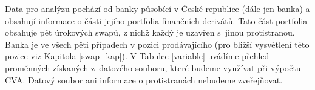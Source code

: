 \documentclass[a4paper,12pt]{report}
\theoremstyle{definition} \newtheorem{definice}[veta]{Definice}
\theoremstyle{remark}
\begin{document}
Data pro analýzu pochází od banky působící v České republice (dále jen banka) a obsahují informace o části jejího portfolia finančních derivátů.
Tato část portfolia obsahuje pět úrokových swapů, z nichž každý je uzavřen s~jinou protistranou.
Banka je ve všech pěti případech v pozici prodávajícího (pro bližší vysvětlení této pozice viz Kapitola \ref{swap_kap}).
V Tabulce \ref{variable} uvádíme přehled proměnných získaných z~datového souboru, které budeme využívat při výpočtu CVA.
Datový soubor ani informace o protistranách nebudeme zveřejňovat.


\begin{table}[!htbp]
\centering
\caption{Proměnné v datovém souboru}  \label{variable}
\vspace{5mm}
\end{table}
\end{document}

